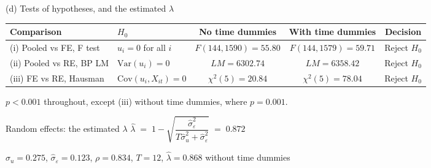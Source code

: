 \documentclass[10pt,aspectratio=169,t]{beamer}
\begin{document}
\begin{frame}{(d) Tests of hypotheses, and the estimated $\lambda$}
\vspace{0.4em}
\begin{center}
\footnotesize
\setlength{\tabcolsep}{5pt}
\begin{tabular}{@{}l l c c c@{}}
\toprule
\textbf{Comparison} & \textbf{$H_0$} & \textbf{No time dummies}
& \textbf{With time dummies} & \textbf{Decision} \\
\midrule
(i) Pooled vs FE, F test & $u_i = 0$ for all $i$
   & $F(144,1590) = 55.80$ & $F(144,1579) = 59.71$ & Reject $H_0$ \\
(ii) Pooled vs RE, BP LM & $\mathrm{Var}(u_i) = 0$
   & $LM = 6302.74$ & $LM = 6358.42$ & Reject $H_0$ \\
(iii) FE vs RE, Hausman & $\mathrm{Cov}(u_i, X_{it}) = 0$
   & $\chi^2(5) = 20.84$ & $\chi^2(5) = 78.04$ & Reject $H_0$ \\
\bottomrule
\end{tabular}
\end{center}
\vspace{0.2em}
{\scriptsize $p < 0.001$ throughout, except (iii) without time dummies, where
$p = 0.001$.}

\vspace{0.9em}
\begin{block}{Random effects: the estimated $\lambda$}
\vspace{0.2em}
\centering
$\hat\lambda \;=\; 1 - \sqrt{\dfrac{\hat\sigma^2_\varepsilon}
{T\hat\sigma^2_u + \hat\sigma^2_\varepsilon}} \;=\; \mathbf{0.872}$

\vspace{0.4em}
{\footnotesize $\hat\sigma_u = 0.275$, \quad
$\hat\sigma_\varepsilon = 0.123$, \quad $\rho = 0.834$, \quad $T = 12$, \quad
$\hat\lambda = 0.868$ without time dummies}
\end{block}
\end{frame}
\end{document}
